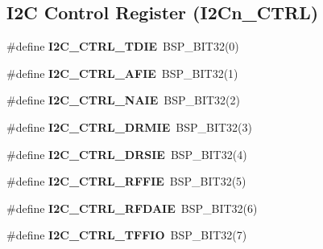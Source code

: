 \subsection*{I2C Control Register (I2\+Cn\+\_\+\+C\+T\+RL)}
\begin{DoxyCompactItemize}
\item 
\mbox{\label{group__lpc32xx__i2c_gaf3f0685acf645f0235e300bb21f3105a}} 
\#define {\bfseries I2\+C\+\_\+\+C\+T\+R\+L\+\_\+\+T\+D\+IE}~B\+S\+P\+\_\+\+B\+I\+T32(0)
\item 
\mbox{\label{group__lpc32xx__i2c_ga12752c60d3a64126a3eb999f92153b16}} 
\#define {\bfseries I2\+C\+\_\+\+C\+T\+R\+L\+\_\+\+A\+F\+IE}~B\+S\+P\+\_\+\+B\+I\+T32(1)
\item 
\mbox{\label{group__lpc32xx__i2c_ga76968b1dc94cea449d7979d417415a58}} 
\#define {\bfseries I2\+C\+\_\+\+C\+T\+R\+L\+\_\+\+N\+A\+IE}~B\+S\+P\+\_\+\+B\+I\+T32(2)
\item 
\mbox{\label{group__lpc32xx__i2c_ga4daacacffbd26af1f71659483f1ac579}} 
\#define {\bfseries I2\+C\+\_\+\+C\+T\+R\+L\+\_\+\+D\+R\+M\+IE}~B\+S\+P\+\_\+\+B\+I\+T32(3)
\item 
\mbox{\label{group__lpc32xx__i2c_ga8064cdec335b592b6502e2b35fdd352f}} 
\#define {\bfseries I2\+C\+\_\+\+C\+T\+R\+L\+\_\+\+D\+R\+S\+IE}~B\+S\+P\+\_\+\+B\+I\+T32(4)
\item 
\mbox{\label{group__lpc32xx__i2c_ga81d2b4b74a487c4c22f5a387fdbb12e6}} 
\#define {\bfseries I2\+C\+\_\+\+C\+T\+R\+L\+\_\+\+R\+F\+F\+IE}~B\+S\+P\+\_\+\+B\+I\+T32(5)
\item 
\mbox{\label{group__lpc32xx__i2c_gab8970941e7bad6984f9da75390406d17}} 
\#define {\bfseries I2\+C\+\_\+\+C\+T\+R\+L\+\_\+\+R\+F\+D\+A\+IE}~B\+S\+P\+\_\+\+B\+I\+T32(6)
\item 
\mbox{\label{group__lpc32xx__i2c_ga0367bdca8446ad14572a4c16e1c46cb2}} 
\#define {\bfseries I2\+C\+\_\+\+C\+T\+R\+L\+\_\+\+T\+F\+F\+IO}~B\+S\+P\+\_\+\+B\+I\+T32(7)
\item 
\mbox{\label{group__lpc32xx__i2c_ga1b39fc037878e8e6014135938c14c8c7}} 

\end{DoxyCompactItemize}
